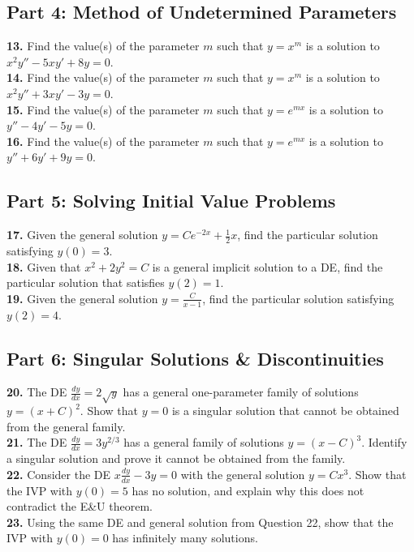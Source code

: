 \documentclass[12pt]{article}
\begin{document}
\subsection*{Part 4: Method of Undetermined Parameters}
\textbf{13.} Find the value(s) of the parameter $m$ such that $y = x^m$ is a solution to $x^2 y'' - 5xy' + 8y = 0$. \\
\textbf{14.} Find the value(s) of the parameter $m$ such that $y = x^m$ is a solution to $x^2 y'' + 3xy' - 3y = 0$. \\
\textbf{15.} Find the value(s) of the parameter $m$ such that $y = e^{mx}$ is a solution to $y'' - 4y' - 5y = 0$. \\
\textbf{16.} Find the value(s) of the parameter $m$ such that $y = e^{mx}$ is a solution to $y'' + 6y' + 9y = 0$.

\subsection*{Part 5: Solving Initial Value Problems}
\textbf{17.} Given the general solution $y = C e^{-2x} + \frac{1}{2}x$, find the particular solution satisfying $y(0) = 3$. \\
\textbf{18.} Given that $x^2 + 2y^2 = C$ is a general implicit solution to a DE, find the particular solution that satisfies $y(2) = 1$. \\
\textbf{19.} Given the general solution $y = \frac{C}{x-1}$, find the particular solution satisfying $y(2) = 4$.

\subsection*{Part 6: Singular Solutions \& Discontinuities}
\textbf{20.} The DE $\frac{dy}{dx} = 2\sqrt{y}$ has a general one-parameter family of solutions $y = (x+C)^2$. Show that $y = 0$ is a singular solution that cannot be obtained from the general family. \\
\textbf{21.} The DE $\frac{dy}{dx} = 3y^{2/3}$ has a general family of solutions $y = (x-C)^3$. Identify a singular solution and prove it cannot be obtained from the family. \\
\textbf{22.} Consider the DE $x \frac{dy}{dx} - 3y = 0$ with the general solution $y = C x^3$. Show that the IVP with $y(0) = 5$ has no solution, and explain why this does not contradict the E\&U theorem. \\
\textbf{23.} Using the same DE and general solution from Question 22, show that the IVP with $y(0) = 0$ has infinitely many solutions.
\end{document}

